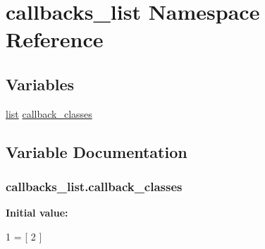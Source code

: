 \hypertarget{namespacecallbacks__list}{}\section{callbacks\+\_\+list Namespace Reference}
\label{namespacecallbacks__list}
\subsection*{Variables}
\begin{DoxyCompactItemize}
\item 
\hyperlink{openflow-interface_8h_afd9bcfa176617760671b67580f536fa7}{list} \hyperlink{namespacecallbacks__list_ad33c58903a531b24c1b46c79ce903a34}{callback\+\_\+classes}
\end{DoxyCompactItemize}


\subsection{Variable Documentation}
\subsubsection[{\texorpdfstring{callback\+\_\+classes}{callback_classes}}]{ callbacks\+\_\+list.\+callback\+\_\+classes}\hypertarget{namespacecallbacks__list_ad33c58903a531b24c1b46c79ce903a34}{}\label{namespacecallbacks__list_ad33c58903a531b24c1b46c79ce903a34}
{\bfseries Initial value\+:}
\begin{DoxyCode}
1 = [
2 ]
\end{DoxyCode}
